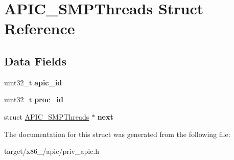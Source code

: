 \hypertarget{structAPIC__SMPThreads}{}\section{A\+P\+I\+C\+\_\+\+S\+M\+P\+Threads Struct Reference}
\label{structAPIC__SMPThreads}
\subsection*{Data Fields}
\begin{DoxyCompactItemize}
\item 
uint32\+\_\+t {\bfseries apic\+\_\+id}\hypertarget{structAPIC__SMPThreads_a57b7a2ed951da2fb4052d2eeab93c13d}{}\label{structAPIC__SMPThreads_a57b7a2ed951da2fb4052d2eeab93c13d}

\item 
uint32\+\_\+t {\bfseries proc\+\_\+id}\hypertarget{structAPIC__SMPThreads_a41a070c3472d2dff3afddd8efd599e4f}{}\label{structAPIC__SMPThreads_a41a070c3472d2dff3afddd8efd599e4f}

\item 
struct \hyperlink{structAPIC__SMPThreads}{A\+P\+I\+C\+\_\+\+S\+M\+P\+Threads} $\ast$ {\bfseries next}\hypertarget{structAPIC__SMPThreads_ad8497f8121f12e75a552587bd0b2406d}{}\label{structAPIC__SMPThreads_ad8497f8121f12e75a552587bd0b2406d}

\end{DoxyCompactItemize}


The documentation for this struct was generated from the following file\+:\begin{DoxyCompactItemize}
\item 
target/x86\+\_/apic/priv\+\_\+apic.\+h\end{DoxyCompactItemize}
